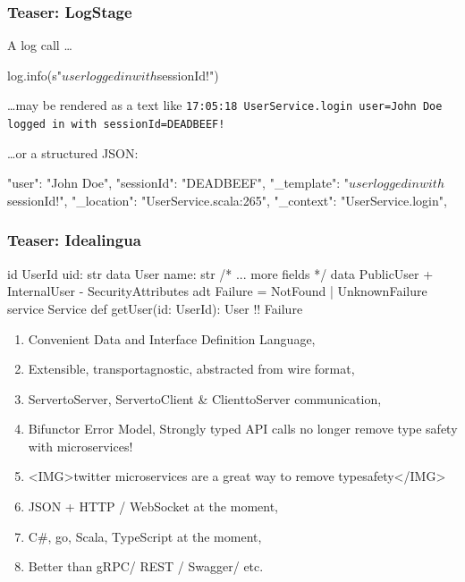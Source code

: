 \documentclass[usenames,dvipsnames]{beamer}
\begin{document}
\begin{frame}[fragile]
\frametitle{Teaser: LogStage}
A log call \dots
\begin{scalacode}
log.info(s"$user logged in with $sessionId!")
\end{scalacode}

\dots may be rendered as a text like \texttt{17:05:18 UserService.login user=John Doe logged in with sessionId=DEADBEEF!}

\dots or a structured JSON:
\begin{jsoncode}
{
  "user": "John Doe",
  "sessionId": "DEADBEEF",
  "_template": "$user logged in with $sessionId!",
  "_location": "UserService.scala:265",
  "_context": "UserService.login",
}
\end{jsoncode}
\end{frame}

\begin{frame}[fragile]
\frametitle{Teaser: Idealingua}
\begin{textcode}
id UserId { uid: str }
data User {  name: str /* ... more fields */ }
data PublicUser {
 + InternalUser
 - SecurityAttributes 
}
adt Failure = NotFound | UnknownFailure
service Service {
  def getUser(id: UserId): User !! Failure
}
\end{textcode}

\begin{enumerate}
\item Convenient Data and Interface Definition Language,
\item Extensible, transport\-agnostic, abstracted from wire format,
\item Server\-to\-Server, Server\-to\-Client \& Client\-to\-Server communication,
\item Bifunctor Error Model, Strongly typed API calls \- no longer remove type safety with microservices!
\item <IMG>twitter microservices are a great way to remove typesafety</IMG>
\item JSON + HTTP / WebSocket at the moment,
\item C\#, go, Scala, TypeScript at the moment,
\item Better than gRPC/ REST / Swagger/ etc.
\end{enumerate}
\end{frame}
\end{document}
